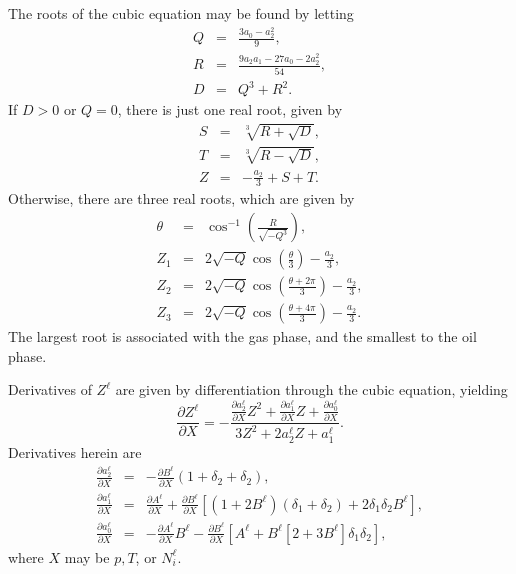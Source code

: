 The roots of the cubic equation may be found by letting
\begin{eqnarray}
  Q & = & \frac{3 a_0 - a_2^2}{9}, \\
  R & = & \frac{9 a_2 a_1 - 27 a_0 - 2 a_2^2}{54}, \\
  D & = & Q^3 + R^2.
\end{eqnarray}
If $D>0$ or $Q=0$, there is just one real root, given by
\begin{eqnarray}
  S & = & \sqrt[3]{R + \sqrt{D}}, \\
  T & = & \sqrt[3]{R - \sqrt{D}}, \\
  Z & = & -\frac{a_2}{3} + S + T.
\end{eqnarray}
Otherwise, there are three real roots, which are given by
\begin{eqnarray}
  \theta & = & \cos^{-1}\left(\frac{R}{\sqrt{-Q^3}}\right), \\
  Z_1 & = & 2\sqrt{-Q}\cos\left(\frac{\theta}{3}\right) - \frac{a_2}{3}, \\
  Z_2 & = & 2\sqrt{-Q}\cos\left(\frac{\theta+2\pi}{3}\right) - \frac{a_2}{3}, \\
  Z_3 & = & 2\sqrt{-Q}\cos\left(\frac{\theta+4\pi}{3}\right) - \frac{a_2}{3}.
\end{eqnarray}
The largest root is associated with the gas phase, and the smallest to
the oil phase.

Derivatives of $Z^\ell$ are given by differentiation through the cubic
equation, yielding
\begin{equation}
  \frac{\partial Z^\ell}{\partial X} = -\frac{
    \frac{\partial a_2^\ell}{\partial X} Z^2 +
    \frac{\partial a_1^\ell}{\partial X} Z +
    \frac{\partial a_0^\ell}{\partial X}}{
    3 Z^2 + 2 a_2^\ell Z + a_1^\ell}.
\end{equation}
Derivatives herein are
\begin{eqnarray}
  \frac{\partial a_2^\ell}{\partial X} & = &
  -\frac{\partial B^\ell}{\partial X}
  (1+\delta_2+\delta_2), \\
  \frac{\partial a_1^\ell}{\partial X} & = &
  \frac{\partial A^\ell}{\partial X} +
  \frac{\partial B^\ell}{\partial X} \left[
    \left( 1 + 2 B^\ell\right)
    \left( \delta_1 + \delta_2 \right) +
    2\delta_1\delta_2 B^\ell \right], \\
  \frac{\partial a_0^\ell}{\partial X} & = &
  -\frac{\partial A^\ell}{\partial X} B^\ell -
  \frac{\partial B^\ell}{\partial X} \left[
    A^\ell + B^\ell \left[ 2 + 3 B^\ell \right]
    \delta_1 \delta_2 \right],
\end{eqnarray}
where $X$ may be $p, T$, or $N_i^\ell$.

